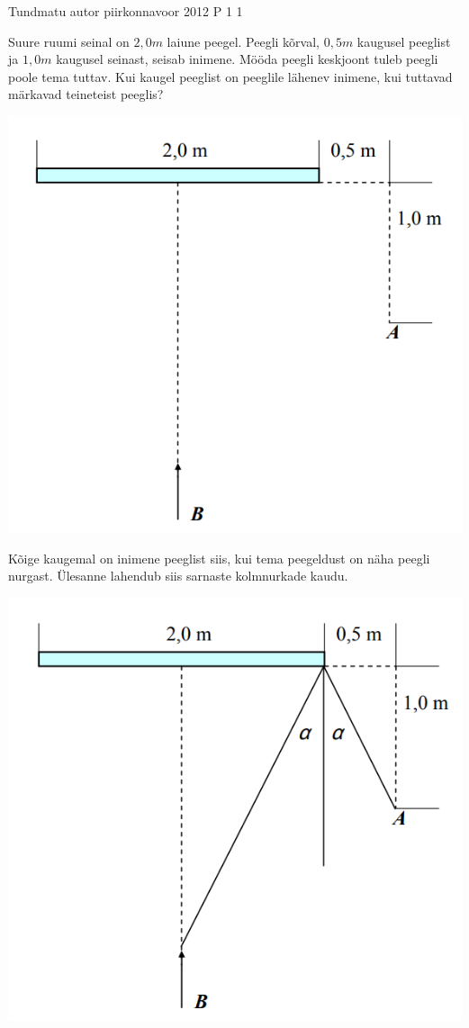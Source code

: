 {Tundmatu autor} %
{piirkonnavoor} %
{2012} %
{P 1} %
{1} %
{
\ifStatement
Suure ruumi seinal on $2,0 m$ laiune peegel. Peegli kõrval, $0,5 m$ kaugusel peeglist ja $1,0 m$ kaugusel seinast, seisab inimene. Mööda peegli keskjoont tuleb peegli poole tema tuttav. Kui kaugel peeglist on peeglile lähenev inimene, kui tuttavad märkavad teineteist peeglis?
\begin{center}
	\includegraphics[width=0.5\linewidth]{2012-v2p-01-yl.PNG}
\end{center}
\fi


\ifHint
Kõige kaugemal on inimene peeglist siis, kui tema peegeldust on näha peegli nurgast. Ülesanne lahendub siis sarnaste kolmnurkade kaudu.
\fi

\ifSolution
\begin{center}
	\includegraphics[width=0.5\linewidth]{2012-v2p-01-lah.PNG}
\end{center}
\fi
}
